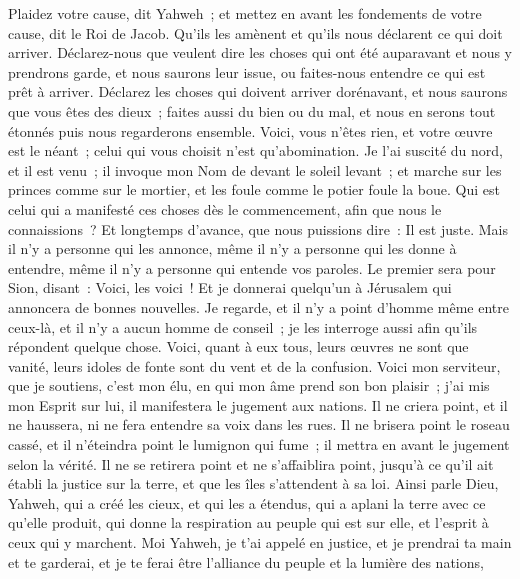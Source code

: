 \begin{multicols}{2}
Plaidez votre cause, dit Yahweh~; et mettez en avant les fondements de votre cause, dit le Roi de Jacob.
Qu'ils les amènent et qu'ils nous déclarent ce qui doit arriver. Déclarez-nous que veulent dire les choses qui ont été auparavant et nous y prendrons garde, et nous saurons leur issue, ou faites-nous entendre ce qui est prêt à arriver. 
Déclarez les choses qui doivent arriver dorénavant, et nous saurons que vous êtes des dieux~; faites aussi du bien ou du mal, et nous en serons tout étonnés puis nous regarderons ensemble.
Voici, vous n'êtes rien, et votre œuvre est le néant~; celui qui vous choisit n'est qu'abomination.
Je l'ai suscité du nord, et il est venu~; il invoque mon Nom de devant le soleil levant~; et marche sur les princes comme sur le mortier, et les foule comme le potier foule la boue.
Qui est celui qui a manifesté ces choses dès le commencement, afin que nous le connaissions~? Et longtemps d'avance, que nous puissions dire~: Il est juste. Mais il n'y a personne qui les annonce, même il n'y a personne qui les donne à entendre, même il n'y a personne qui entende vos paroles.
Le premier sera pour Sion, disant~: Voici, les voici~! Et je donnerai quelqu'un à Jérusalem qui annoncera de bonnes nouvelles.
Je regarde, et il n'y a point d'homme même entre ceux-là, et il n'y a aucun homme de conseil~; je les interroge aussi afin qu'ils répondent quelque chose. 
Voici, quant à eux tous, leurs œuvres ne sont que vanité, leurs idoles de fonte sont du vent et de la confusion.
\VerseOne{}Voici mon serviteur, que je soutiens, c'est mon élu, en qui mon âme prend son bon plaisir~; j'ai mis mon Esprit sur lui, il manifestera le jugement aux nations.
Il ne criera point, et il ne haussera, ni ne fera entendre sa voix dans les rues.
Il ne brisera point le roseau cassé, et il n'éteindra point le lumignon qui fume~; il mettra en avant le jugement selon la vérité.
Il ne se retirera point et ne s'affaiblira point, jusqu'à ce qu'il ait établi la justice sur la terre, et que les îles s'attendent à sa loi.
Ainsi parle Dieu, Yahweh, qui a créé les cieux, et qui les a étendus, qui a aplani la terre avec ce qu'elle produit, qui donne la respiration au peuple qui est sur elle, et l'esprit à ceux qui y marchent.
Moi Yahweh, je t'ai appelé en justice, et je prendrai ta main et te garderai, et je te ferai être l'alliance du peuple et la lumière des nations,

\end{multicols}
